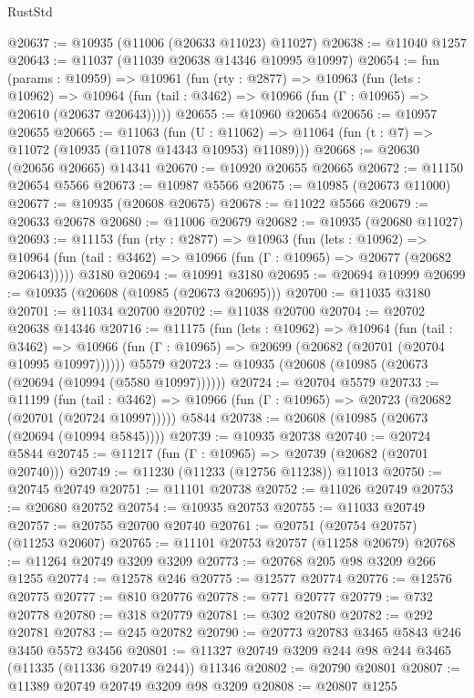 \begin{lexlean}{RustStd}
\begin{coremodule}
{{{{{{{{{{{{{{{{{{{@20637 := @10935 (@11006 (@20633 @11023) @11027)
@20638 := @11040 @1257
@20643 := @11037 (@11039 @20638 @14346 @10995 @10997)
@20654 := fun (params : @10959) =>
  @10961
    (fun (rty : @2877) =>
    @10963
      (fun (lets : @10962) =>
      @10964 (fun (tail : @3462) => @10966 (fun (Γ : @10965) => @20610 (@20637 @20643)))))
@20655 := @10960 @20654
@20656 := @10957 @20655
@20665 := @11063
    (fun (U : @11062) => @11064 (fun (t : @7) => @11072 (@10935 (@11078 @14343 @10953) @11089)))
@20668 := @20630 (@20656 @20665) @14341
@20670 := @10920 @20655 @20665
@20672 := @11150 @20654 @5566
@20673 := @10987 @5566
@20675 := @10985 (@20673 @11000)
@20677 := @10935 (@20608 @20675)
@20678 := @11022 @5566
@20679 := @20633 @20678
@20680 := @11006 @20679
@20682 := @10935 (@20680 @11027)
@20693 := @11153
    (fun (rty : @2877) =>
    @10963
      (fun (lets : @10962) =>
      @10964 (fun (tail : @3462) => @10966 (fun (Γ : @10965) => @20677 (@20682 @20643)))))
    @3180
@20694 := @10991 @3180
@20695 := @20694 @10999
@20699 := @10935 (@20608 (@10985 (@20673 @20695)))
@20700 := @11035 @3180
@20701 := @11034 @20700
@20702 := @11038 @20700
@20704 := @20702 @20638 @14346
@20716 := @11175
    (fun (lets : @10962) =>
    @10964
      (fun (tail : @3462) =>
      @10966 (fun (Γ : @10965) => @20699 (@20682 (@20701 (@20704 @10995 @10997))))))
    @5579
@20723 := @10935 (@20608 (@10985 (@20673 (@20694 (@10994 (@5580 @10997))))))
@20724 := @20704 @5579
@20733 := @11199
    (fun (tail : @3462) => @10966 (fun (Γ : @10965) => @20723 (@20682 (@20701 (@20724 @10997)))))
    @5844
@20738 := @20608 (@10985 (@20673 (@20694 (@10994 @5845))))
@20739 := @10935 @20738
@20740 := @20724 @5844
@20745 := @11217 (fun (Γ : @10965) => @20739 (@20682 (@20701 @20740)))
@20749 := @11230 (@11233 (@12756 @11238)) @11013
@20750 := @20745 @20749
@20751 := @11101 @20738
@20752 := @11026 @20749
@20753 := @20680 @20752
@20754 := @10935 @20753
@20755 := @11033 @20749
@20757 := @20755 @20700 @20740
@20761 := @20751 (@20754 @20757) (@11253 @20607)
@20765 := @11101 @20753 @20757 (@11258 @20679)
@20768 := @11264 @20749 @3209 @3209
@20773 := @20768 @205 @98 @3209 @266 @1255
@20774 := @12578 @246
@20775 := @12577 @20774
@20776 := @12576 @20775
@20777 := @810 @20776
@20778 := @771 @20777
@20779 := @732 @20778
@20780 := @318 @20779
@20781 := @302 @20780
@20782 := @292 @20781
@20783 := @245 @20782
@20790 := @20773 @20783 @3465 @5843 @246 @3450 @5572 @3456
@20801 := @11327 @20749 @3209 @244 @98 @244 @3465 (@11335 (@11336 @20749 @244)) @11346
@20802 := @20790 @20801
@20807 := @11389 @20749 @20749 @3209 @98 @3209
@20808 := @20807 @1255
}}}}}}}}}}}}}}}}}}}
\end{coremodule}
\end{lexlean}
